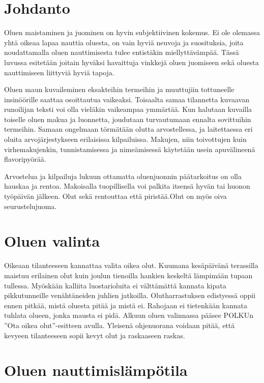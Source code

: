 \documentclass[a4paper,11pt]{report}
\begin{document}
\section{Johdanto}

Oluen maistaminen ja juominen on hyvin subjektiivinen kokemus. Ei ole olemassa yhtä oikeaa lapaa nauttia oluesta, on vain hyviä neuvoja ja suosituksia, joita noudattamalla oluen nauttimisesta tulee entistäkin miellyttävämpää. Tässä luvussa esitetään joitain hyväksi havaittuja vinkkejä oluen juomiseen sekä oluesta nauttimiseen liittyviä hyviä tapoja.

Oluen maun kuvaileminen eksakteihin termeihin ja muuttujiin tottuneelle insinöörille saattaa osoittautua vaikeaksi. Toisaalta samaa tilannetta kuvaavan runoilijan teksti voi olla vieläkin vaikeampaa ymmärtää. Kun halutaan kuvailla toiselle oluen makua ja luonnetta, joudutaan turvautumaan ennalta sovittuihin termeihin. Samaan ongelmaan törmätään olutta arvostellessa, ja laitettaessa eri oluita arvojärjestykseen erilaisissa kilpailuissa. Makujen, niin toivottujen kuin virhemakujenkin, tunnistamisessa ja nimeämisessä käytetään usein apuvälineenä flavoripyörää.

Arvostelua ja kilpailuja lukuun ottamatta oluenjuonnin päätarkoitus on olla hauskaa ja rentoa. Makoisalla tuopillisella voi palkita itsensä hyvän tai huonon työpäivän jälkeen. Olut sekä rentouttaa että piristää.Olut on myös oiva seurustelujuoma.

\section{Oluen valinta}

Oikeaan tilanteeseen kannattaa valita oikea olut. Kuumana kesäpäivänä terassilla maistuu erilainen olut kuin joulun tienoilla hankien keskeltä lämpimään tupaan tullessa. Myöskään kalliita luostarioluita ei välttämättä kannata kipata pikkutunneille venähtäneiden juhlien jatkoilla. Olutharrastuksen edistyessä oppii ennen pitkää, mistä oluesta pitää ja mistä ei. Rahojaan ei tietenkään kannata tuhlata olueen, jonka mausta ei pidä. Alkuun oluen valinnassa pääsee POLKUn ''Ota oikea olut''-esitteen avulla. Yleisenä ohjenuorana voidaan pitää, että kevyeen tilanteeseen sopii kevyt olut ja raskaaseen raskas.

\section{Oluen nauttimislämpötila}
\end{document}
